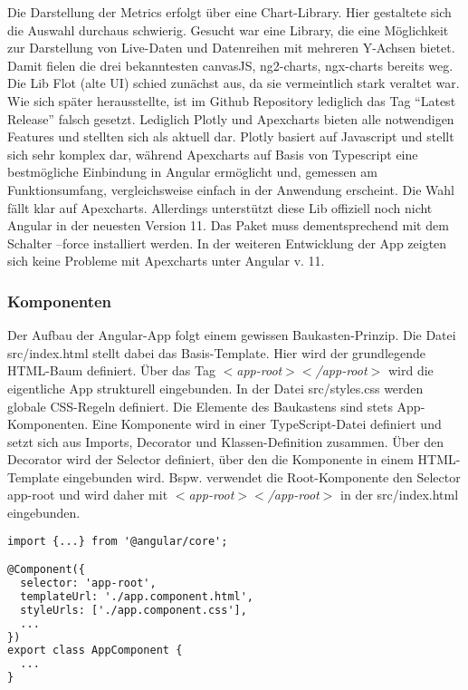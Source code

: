 \documentclass[conference]{IEEEtran}
\begin{document}
Die Darstellung der Metrics erfolgt über eine Chart-Library. Hier gestaltete sich die Auswahl durchaus schwierig. Gesucht war eine Library, die eine Möglichkeit zur Darstellung von Live-Daten und Datenreihen mit mehreren Y-Achsen bietet. Damit fielen die drei bekanntesten canvasJS, ng2-charts, ngx-charts bereits weg. Die Lib Flot (alte UI) schied zunächst aus, da sie vermeintlich stark veraltet war. Wie sich später herausstellte, ist im Github Repository lediglich das Tag ``Latest Release'' falsch gesetzt\cite{b11}. Lediglich Plotly und Apexcharts bieten alle notwendigen Features und stellten sich als aktuell dar. Plotly basiert auf Javascript und stellt sich sehr komplex dar, während Apexcharts auf Basis von Typescript eine bestmögliche Einbindung in Angular ermöglicht und, gemessen am Funktionsumfang, vergleichsweise einfach in der Anwendung erscheint. Die Wahl fällt klar auf Apexcharts\cite{b9}. Allerdings unterstützt diese Lib offiziell noch nicht Angular in der neuesten Version 11. Das Paket muss dementsprechend mit dem Schalter --force installiert werden. In der weiteren Entwicklung der App zeigten sich keine Probleme mit Apexcharts unter Angular v. 11. 

\subsubsection{Komponenten}
Der Aufbau der Angular-App folgt einem gewissen Baukasten-Prinzip. Die Datei src/index.html stellt dabei das Basis-Template. Hier wird der grundlegende HTML-Baum definiert. Über das Tag \emph{$<$app-root$><$/app-root$>$} wird die eigentliche App strukturell eingebunden. In der Datei src/styles.css werden globale CSS-Regeln definiert. Die Elemente des Baukastens sind stets App-Komponenten. Eine Komponente wird in einer TypeScript-Datei definiert und setzt sich aus Imports, Decorator und Klassen-Definition zusammen. Über den Decorator wird der Selector definiert, über den die Komponente in einem HTML-Template eingebunden wird. Bspw. verwendet die Root-Komponente den Selector app-root und wird daher mit \emph{$<$app-root$><$/app-root$>$} in der src/index.html eingebunden.


\begin{lstlisting}[language=xml, caption=Angular Komponente=\small]
import {...} from '@angular/core';

@Component({
  selector: 'app-root',
  templateUrl: './app.component.html',
  styleUrls: ['./app.component.css'],
  ...
})
export class AppComponent {
  ...
}
\end{lstlisting}
\end{document}
